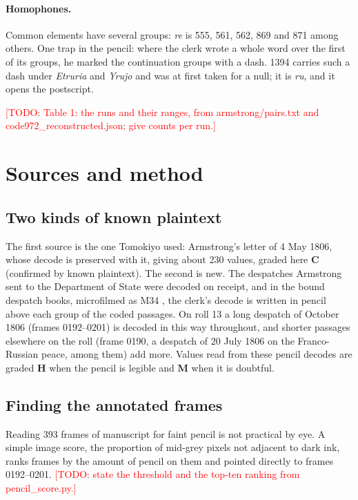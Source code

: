 \documentclass[11pt]{article}
\newcommand{\todo}[1]{\textcolor{red}{[TODO: #1]}}
\newcommand{\grp}[1]{\textsf{#1}}
\begin{document}
\paragraph{Homophones.} Common elements have several groups: \emph{re} is \grp{555}, \grp{561}, \grp{562}, \grp{869} and \grp{871} among others. One trap in the pencil: where the clerk wrote a whole word over the first of its groups, he marked the continuation groups with a dash. \grp{1394} carries such a dash under \emph{Etruria} and \emph{Yrujo} and was at first taken for a null; it is \emph{ru}, and it opens the postscript.

\todo{Table 1: the runs and their ranges, from armstrong/pairs.txt and code972\_reconstructed.json; give counts per run.}

\section{Sources and method}\label{sec:method}

\subsection{Two kinds of known plaintext}

The first source is the one Tomokiyo used: Armstrong's letter of 4 May 1806, whose decode is preserved with it, giving about 230 values, graded here \textbf{C} (confirmed by known plaintext). The second is new. The despatches Armstrong sent to the Department of State were decoded on receipt, and in the bound despatch books, microfilmed as M34 \cite{NARA:M34}, the clerk's decode is written in pencil above each group of the coded passages. On roll 13 a long despatch of October 1806 (frames 0192--0201) is decoded in this way throughout, and shorter passages elsewhere on the roll (frame 0190, a despatch of 20 July 1806 on the Franco-Russian peace, among them) add more. Values read from these pencil decodes are graded \textbf{H} when the pencil is legible and \textbf{M} when it is doubtful.

\subsection{Finding the annotated frames}

Reading 393 frames of manuscript for faint pencil is not practical by eye. A simple image score, the proportion of mid-grey pixels not adjacent to dark ink, ranks frames by the amount of pencil on them and pointed directly to frames 0192--0201. \todo{state the threshold and the top-ten ranking from pencil\_score.py.}
\end{document}
